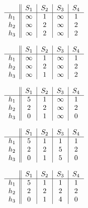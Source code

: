 \documentclass{article}
\begin{document}
\begin{enumerate}
{\begin{center}
	\begin{equation}
	\begin{tabular}{ c || c | c | c | c }
		      & $S_1$    & $S_2$ & $S_3$    & $S_4$ \\ \hline
		$h_1$ & $\infty$ & 1     & $\infty$ & 1     \\
		$h_2$ & $\infty$ & 2     & $\infty$ & 2     \\
		$h_3$ & $\infty$ & 2     & $\infty$ & 2
	\end{tabular}
	\end{equation}
	
	\begin{equation}
	\begin{tabular}{ c || c | c | c | c }
		      & $S_1$    & $S_2$ & $S_3$    & $S_4$ \\ \hline
		$h_1$ & $\infty$ & 1     & $\infty$ & 1     \\
		$h_2$ & $\infty$ & 2     & $\infty$ & 2     \\
		$h_3$ & $\infty$ & 1     & $\infty$ & 2
	\end{tabular}
	\end{equation}
	
	\begin{equation}
	\begin{tabular}{ c || c | c | c | c }
		      & $S_1$ & $S_2$ & $S_3$    & $S_4$ \\ \hline
		$h_1$ & 5     & 1     & $\infty$ & 1     \\
		$h_2$ & 2     & 2     & $\infty$ & 2     \\
		$h_3$ & 0     & 1     & $\infty$ & 0
	\end{tabular}
	\end{equation}
	
	\begin{equation}
	\begin{tabular}{ c || c | c | c | c }
		      & $S_1$ & $S_2$ & $S_3$ & $S_4$ \\ \hline
		$h_1$ & 5     & 1     & 1     & 1     \\
		$h_2$ & 2     & 2     & 5     & 2     \\
		$h_3$ & 0     & 1     & 5     & 0
	\end{tabular}
	\end{equation}

	\begin{equation}
	\begin{tabular}{ c || c | c | c | c }
		      & $S_1$ & $S_2$ & $S_3$ & $S_4$ \\ \hline
		$h_1$ & 5     & 1     & 1     & 1     \\
		$h_2$ & 2     & 2     & 2     & 2     \\
		$h_3$ & 0     & 1     & 4     & 0
	\end{tabular}
	\end{equation}


\end{center}}
\end{enumerate}
\end{document}
